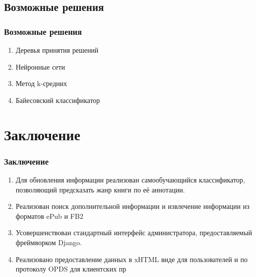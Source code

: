 \documentclass[handout]{beamer}
\begin{document}
\subsection{Возможные решения}
  \begin{frame}
    \frametitle{Возможные решения}  
    
    \begin{enumerate}
      \item Деревья принятия решений
      \item Нейронные сети
      \item Метод k-средних
      \item Байесовский классификатор
    \end{enumerate}        
  \end{frame}


\section{Заключение}
  \begin{frame}
    \frametitle{Заключение}
    \begin{enumerate}
      \item Для обновления информации реализован самообучающийся классификатор, позволяющий предсказать жанр книги по её аннотации.
	  \item Реализован поиск дополнительной информации и извлечение информации из форматов ePub и FB2
	  \item Усовершенствован стандартный интерфейс администратора, предоставляемый фреймворком Django.
	  \item Реализовано предоставление данных в xHTML виде для пользователей и по протоколу OPDS для клиентских пр
    \end{enumerate}
  \end{frame}
\end{document}
